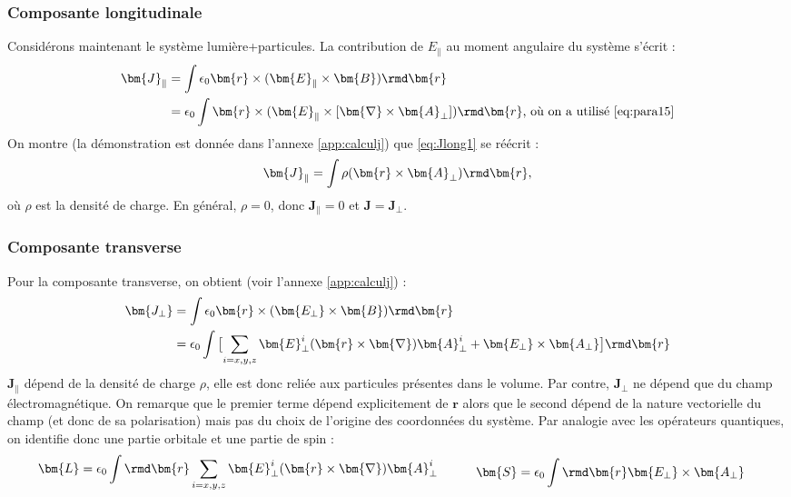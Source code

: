 \subsubsection{Composante longitudinale}
Considérons maintenant le système {lumière+particules}. La contribution de $E_{\parallel}$ au moment angulaire du système s'écrit : 
\begin{align}
\bm{J}_{\parallel}&=\int{\epsilon_0\bm{r}\times(\bm{E}_{\parallel}\times\bm{B})\rmd\bm{r}}\nonumber\\
&=\epsilon_0\int{\bm{r}\times(\bm{E}_{\parallel}\times\left[\bm{\nabla}\times\bm{A}_{\bot}\right])\rmd\bm{r}}\text{, où on a utilisé \ref{eq:para15}}%
\label{eq:Jlong1}
\end{align}
On montre (la démonstration est donnée dans l'annexe \ref{app:calculj}) que \ref{eq:Jlong1} se réécrit :
\begin{equation}
\bm{J}_{\parallel}=\int{\rho(\bm{r}\times\bm{A}_{\bot})\rmd\bm{r}},
\label{eq:Jlong4}
\end{equation}
où $\rho$ est la densité de charge. En général, $\rho = 0$, donc $\bm{J}_{\parallel} = 0$ et $\bm{J}=\bm{J}_{\bot}$.

\subsubsection{Composante transverse}
Pour la composante transverse, on obtient (voir l'annexe \ref{app:calculj}) :
\begin{align}
\bm{J_{\bot}}&=\int{\epsilon_0\bm{r}\times(\bm{E_{\bot}}\times\bm{B})\rmd\bm{r}}\nonumber\\
&=\epsilon_0\int{\bigl[\sum_{i=x,y,z} \bm{E}^i_{\bot}(\bm{r}\times\bm{\nabla})\bm{A}^i_{\bot}+\bm{E_{\bot}}\times\bm{A_{\bot}}\bigr]\rmd\bm{r}}
\label{eq:Jtran}
\end{align}
$\bm{J_{\parallel}}$ dépend de la densité de charge $\rho$, elle est donc reliée aux particules présentes dans le volume. Par contre, $\bm{J_{\bot}}$ ne dépend que du champ électromagnétique. On remarque que le premier terme dépend explicitement de $\bm{r}$ alors que le second dépend de la nature vectorielle du champ (et donc de sa polarisation) mais pas du choix de l'origine des coordonnées du système. Par analogie avec les opérateurs quantiques, on identifie donc une partie orbitale et une partie de spin :
\begin{equation}
\begin{aligned}[c]
\bm{L}&=\epsilon_0\int{\rmd\bm{r}\sum_{i=x,y,z} \bm{E}^i_{\bot}(\bm{r}\times\bm{\nabla})\bm{A}^i_{\bot}}
\end{aligned}
\qquad
\begin{aligned}[c]
\bm{S}&=\epsilon_0\int{\rmd\bm{r}\bm{E_{\bot}}\times\bm{A_{\bot}}}
\end{aligned}
\label{SeparationJS_classique}
\end{equation} 
 
